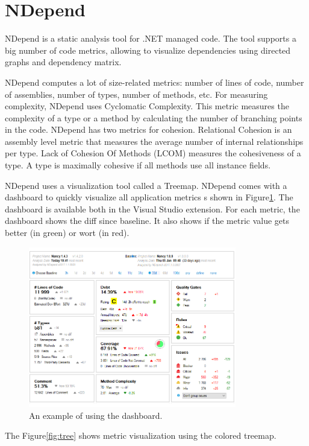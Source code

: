 \section{NDepend}

NDepend is a static analysis tool for .NET managed code. The tool supports a big number of code metrics, allowing to visualize dependencies using directed graphs and dependency matrix.  

NDepend computes a lot of size-related metrics: number of lines of code, number of assemblies, number of types, number of methods, etc. For measuring complexity, NDepend uses Cyclomatic Complexity. This metric measures the complexity of a type or a method by calculating the number of branching points in the code.
NDepend has two metrics for cohesion. Relational Cohesion is an assembly level metric that measures the average number of internal relationships per type. Lack of Cohesion Of Methods (LCOM) measures the cohesiveness of a type. A type is maximally cohesive if all methods use all instance fields.

NDepend uses a visualization tool called a Treemap.
NDepend comes with a dashboard to quickly visualize all application metrics s shown in Figure\ref{fig:dash}. The dashboard is available both in the Visual Studio extension. For each metric, the dashboard shows the diff since baseline. It also shows if the metric value gets better (in green) or wort (in red). 

\begin{figure}[h]
	\centering
	\includegraphics[height=70mm]{figures/dash.png}
	\caption{An example of using the dashboard.}
	\label{fig:dash}
\end{figure}

The Figure\ref{fig:tree} shows metric visualization using the colored treemap.

